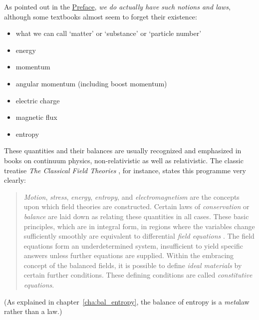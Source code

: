 \documentclass[a4paper,12pt,%
onecolumn,oneside,%
british%
]{memoir}
\renewcommand*{\|}[1][]{\nonscript\:#1\vert\nonscript\:\mathopen{}}
\newcommand*{\chap}{chapter}%
\begin{document}
As pointed out in the \hyperref[cha:preface]{Preface}, \emph{we do actually have such notions and laws}, although some textbooks almost seem to forget their existence:
\begin{itemize}[nosep]
\item what we can call \enquote*{matter} or \enquote*{substance} or \enquote*{particle number}
\item energy
\item momentum
\item angular momentum (including boost momentum)
\item electric charge
\item magnetic flux
\item entropy
\end{itemize}
These quantities and their balances are usually recognized and emphasized in books on continuum physics, non-relativistic as well as relativistic. The classic treatise \emph{The Classical Field Theories} \parencites*{truesdelletal1960}, for instance, states this programme very clearly:
\begin{quote}
  \emph{Motion}, \emph{stress}, \emph{energy}, \emph{entropy}, and \emph{electromagnetism} are the concepts upon which field theories are constructed. Certain laws of \emph{conservation} or \emph{balance} are laid down as relating these quantities in all cases. These basic principles, which are in integral form, in regions where the variables change sufficiently smoothly are equivalent to differential \emph{field equations} \textelp{}. The field equations \textelp{} form an underdetermined system, insufficient to yield specific answers unless further equations are supplied. Within the embracing concept of the balanced fields, it is possible to define \emph{ideal materials} by certain further conditions. These defining conditions are called \emph{constitutive equations}.
\end{quote}
(As explained in \chap~\ref{cha:bal_entropy}, the balance of entropy is a \emph{meta}law rather than a law.)

\medskip
\end{document}
